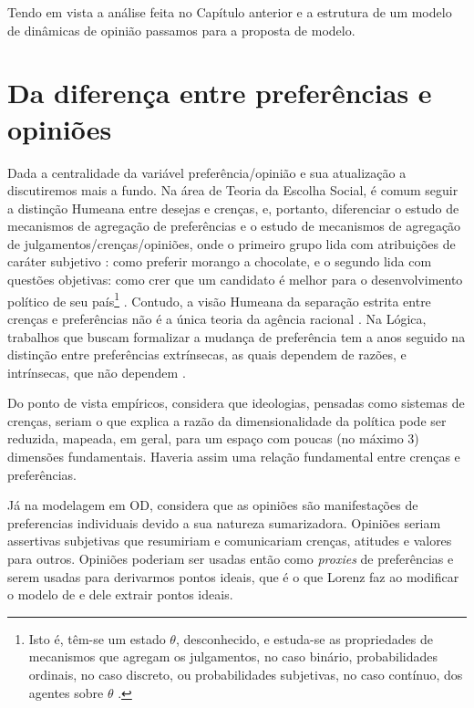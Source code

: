 Tendo em vista a análise feita no Capítulo anterior e a estrutura de um modelo de
dinâmicas de opinião passamos para a proposta de modelo.


\section{Da diferença entre preferências e opiniões}


Dada a centralidade da variável preferência/opinião e sua atualização a
discutiremos mais a fundo. Na área de Teoria da Escolha Social, é comum seguir a
distinção Humeana entre desejas e crenças, e, portanto, diferenciar o estudo de
mecanismos de agregação de preferências e o estudo de mecanismos de agregação de
julgamentos/crenças/opiniões, onde o primeiro grupo lida com atribuições de
caráter subjetivo : como preferir morango a chocolate, e o segundo lida com
questões objetivas: como crer que um candidato é melhor para o desenvolvimento
político de seu país\footnote{Isto é, têm-se um estado $\theta$, desconhecido, e
  estuda-se as propriedades de mecanismos que agregam os julgamentos, no caso
  binário, probabilidades ordinais, no caso discreto, ou probabilidades
  subjetivas, no caso contínuo, dos agentes sobre $\theta$
  \cite{dietrich2010aggregation}.}
\cite{brandt2016handbook,dietrich2010aggregation}. Contudo, a visão Humeana da
separação estrita entre crenças e preferências não é a única teoria da agência
racional \cite{dietrich2010aggregation}. Na Lógica, trabalhos que buscam
formalizar a mudança de preferência tem a anos seguido 
na distinção entre preferências extrínsecas, as quais dependem de razões, e
intrínsecas, que não dependem \cite{liu2010wright}. 


Do ponto de vista empíricos,  considera que
ideologias, pensadas como sistemas de crenças, seriam o que explica a razão da
dimensionalidade da política pode ser reduzida, mapeada, em geral, para um
espaço com poucas (no máximo 3) dimensões fundamentais. Haveria assim uma
relação fundamental entre crenças e preferências.

Já na modelagem em OD,  considera que as opiniões
são manifestações de preferencias individuais devido a sua natureza
sumarizadora. Opiniões seriam assertivas subjetivas que resumiriam e
comunicariam crenças, atitudes e valores para outros. Opiniões poderiam ser
usadas então como \textit{proxies} de preferências e serem usadas para
derivarmos pontos ideais, que é o que Lorenz faz ao modificar o modelo de
 e dele extrair pontos ideais.



